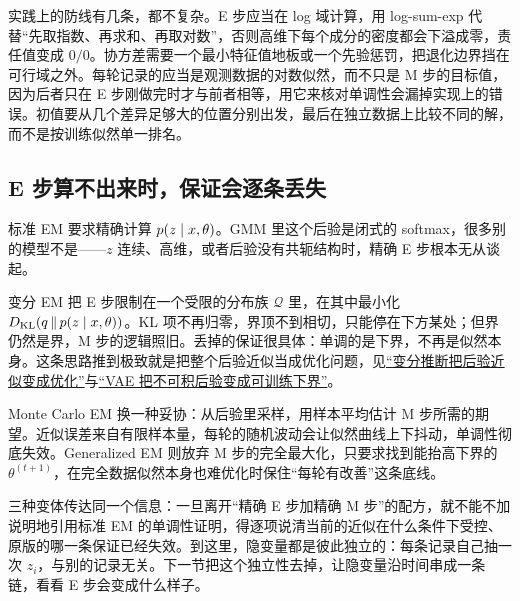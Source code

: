 实践上的防线有几条，都不复杂。E 步应当在 log 域计算，用 log-sum-exp 代替``先取指数、再求和、再取对数''，否则高维下每个成分的密度都会下溢成零，责任值变成 \(0/0\)。协方差需要一个最小特征值地板或一个先验惩罚，把退化边界挡在可行域之外。每轮记录的应当是观测数据的对数似然，而不只是 M 步的目标值，因为后者只在 E 步刚做完时才与前者相等，用它来核对单调性会漏掉实现上的错误。初值要从几个差异足够大的位置分别出发，最后在独立数据上比较不同的解，而不是按训练似然单一排名。

\subsection{E 步算不出来时，保证会逐条丢失}

标准 EM 要求精确计算 \(p(z\mid x,\theta)\)。GMM 里这个后验是闭式的 softmax，很多别的模型不是——\(z\) 连续、高维，或者后验没有共轭结构时，精确 E 步根本无从谈起。

变分 EM 把 E 步限制在一个受限的分布族 \(\mathcal Q\) 里，在其中最小化 \(D_{\mathrm{KL}}(q\,\|\,p(z\mid x,\theta))\)。KL 项不再归零，界顶不到相切，只能停在下方某处；但界仍然是界，M 步的逻辑照旧。丢掉的保证很具体：单调的是下界，不再是似然本身。这条思路推到极致就是把整个后验近似当成优化问题，见\hyperref[sec:13-Machine-Learning/08-Sampling-and-Inference/03]{``变分推断把后验近似变成优化''}与\hyperref[sec:14-Deep-Learning/06-Variational-Autoencoders/01]{``VAE 把不可积后验变成可训练下界''}。

Monte Carlo EM 换一种妥协：从后验里采样，用样本平均估计 M 步所需的期望。近似误差来自有限样本量，每轮的随机波动会让似然曲线上下抖动，单调性彻底失效。Generalized EM 则放弃 M 步的完全最大化，只要求找到能抬高下界的 \(\theta^{(t+1)}\)，在完全数据似然本身也难优化时保住``每轮有改善''这条底线。

三种变体传达同一个信息：一旦离开``精确 E 步加精确 M 步''的配方，就不能不加说明地引用标准 EM 的单调性证明，得逐项说清当前的近似在什么条件下受控、原版的哪一条保证已经失效。到这里，隐变量都是彼此独立的：每条记录自己抽一次 \(z_i\)，与别的记录无关。下一节把这个独立性去掉，让隐变量沿时间串成一条链，看看 E 步会变成什么样子。
